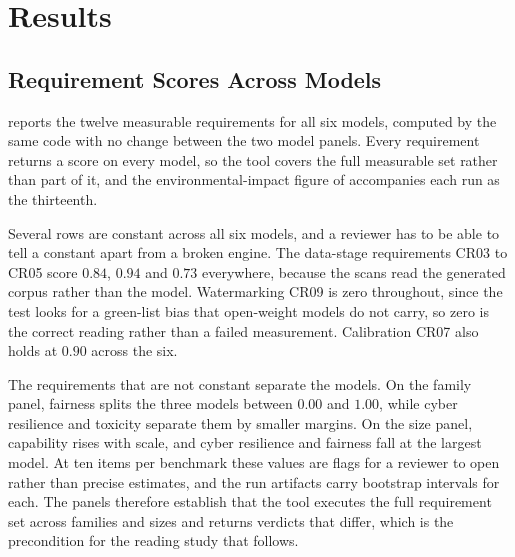 \documentclass[10pt,conference]{IEEEtran}
\begin{document}
\section{Results}
\label{sec:results}

\subsection{Requirement Scores Across Models}
\label{sec:panelresults}
 reports the twelve measurable requirements for all six models, computed by the same code with no change between the two model panels.
Every requirement returns a score on every model, so the tool covers the full measurable set rather than part of it, and the environmental-impact figure of  accompanies each run as the thirteenth.

Several rows are constant across all six models, and a reviewer has to be able to tell a constant apart from a broken engine.
The data-stage requirements CR03 to CR05 score $0.84$, $0.94$ and $0.73$ everywhere, because the scans read the generated corpus rather than the model.
Watermarking CR09 is zero throughout, since the test looks for a green-list bias that open-weight models do not carry, so zero is the correct reading rather than a failed measurement.
Calibration CR07 also holds at $0.90$ across the six.

The requirements that are not constant separate the models.
On the family panel, fairness splits the three models between $0.00$ and $1.00$, while cyber resilience and toxicity separate them by smaller margins.
On the size panel, capability rises with scale, and cyber resilience and fairness fall at the largest model.
At ten items per benchmark these values are flags for a reviewer to open rather than precise estimates, and the run artifacts carry bootstrap intervals for each.
The panels therefore establish that the tool executes the full requirement set across families and sizes and returns verdicts that differ, which is the precondition for the reading study that follows.
\end{document}
